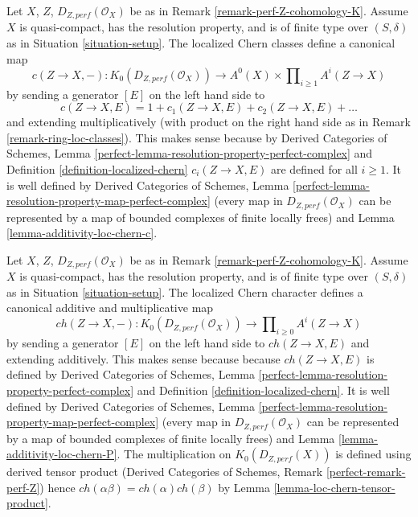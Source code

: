 \begin{remark}
\label{remark-localized-chern-classes-K}
Let $X$, $Z$, $D_{Z, perf}(\mathcal{O}_X)$ be as in
Remark \ref{remark-perf-Z-cohomology-K}.
Assume $X$ is quasi-compact, has the resolution property, and
is of finite type over $(S, \delta)$ as in Situation \ref{situation-setup}.
The localized Chern classes define a canonical map
$$
c(Z \to X, -) : K_0(D_{Z, perf}(\mathcal{O}_X)) \longrightarrow
A^0(X) \times \prod\nolimits_{i \geq 1} A^i(Z \to X)
$$
by sending a generator $[E]$ on the left hand side to
$$
c(Z \to X, E) = 1 + c_1(Z \to X, E) + c_2(Z \to X, E) + \ldots
$$
and extending multiplicatively (with product on the right hand
side as in Remark \ref{remark-ring-loc-classes}). This makes sense because by
Derived Categories of Schemes, Lemma
\ref{perfect-lemma-resolution-property-perfect-complex}
and Definition \ref{definition-localized-chern}
$c_i(Z \to X, E) $ are defined for all $i \geq 1$.
It is well defined by Derived Categories of Schemes, Lemma
\ref{perfect-lemma-resolution-property-map-perfect-complex}
(every map in $D_{Z, perf}(\mathcal{O}_X)$ can be represented
by a map of bounded complexes of finite locally frees) and
Lemma \ref{lemma-additivity-loc-chern-c}.
\end{remark}

\begin{remark}
\label{remark-localized-chern-character-K}
Let $X$, $Z$, $D_{Z, perf}(\mathcal{O}_X)$
be as in Remark \ref{remark-perf-Z-cohomology-K}.
Assume $X$ is quasi-compact, has the resolution property, and is
of finite type over $(S, \delta)$ as in Situation \ref{situation-setup}.
The localized Chern character defines a canonical additive
and multiplicative map
$$
ch(Z \to X, -) : K_0(D_{Z, perf}(\mathcal{O}_X)) \longrightarrow
\prod\nolimits_{i \geq 0} A^i(Z \to X)
$$
by sending a generator $[E]$ on the left hand side to
$ch(Z \to X, E)$ and extending additively. This makes sense because because
$ch(Z \to X, E)$ is defined by
Derived Categories of Schemes, Lemma
\ref{perfect-lemma-resolution-property-perfect-complex}
and Definition \ref{definition-localized-chern}.
It is well defined by Derived Categories of Schemes, Lemma
\ref{perfect-lemma-resolution-property-map-perfect-complex}
(every map in $D_{Z, perf}(\mathcal{O}_X)$ can be represented
by a map of bounded complexes of finite locally frees) and
Lemma \ref{lemma-additivity-loc-chern-P}. The multiplication on
$K_0(D_{Z, perf}(X))$ is defined using derived tensor product
(Derived Categories of Schemes, Remark \ref{perfect-remark-perf-Z})
hence $ch(\alpha \beta) = ch(\alpha) ch(\beta)$ by
Lemma \ref{lemma-loc-chern-tensor-product}.
\end{remark}

